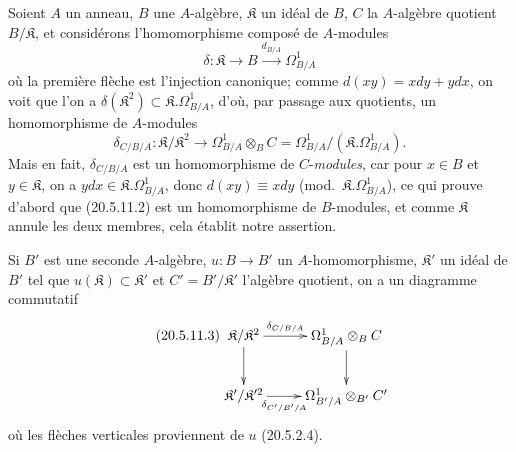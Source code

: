 \begin{env}[20.5.11]
\label{0.20.5.11-fr}
Soient $A$ un anneau, $B$ une $A$-algèbre, $\mathfrak{K}$ un idéal de $B$,
$C$ la $A$-algèbre quotient $B/\mathfrak{K}$, et considérons
l'homomorphisme composé de $A$-modules
\begin{equation}
\tag{20.5.11.1}
\label{0.20.5.11.1-fr}
  \delta:\mathfrak{K}\longrightarrow B\xrightarrow{d_{B/A}}\Omega^1_{B/A}
\end{equation}
où la première flèche est l'injection canonique; comme
$d(xy)=xdy+ydx$, on voit que l'on a
$\delta(\mathfrak{K}^2)\subset\mathfrak{K}.\Omega^1_{B/A}$, d'où, par
passage aux quotients, un homomorphisme de $A$-modules
\begin{equation}
\tag{20.5.11.2}
\label{0.20.5.11.2-fr}
  \delta_{C/B/A}:\mathfrak{K}/\mathfrak{K}^2\longrightarrow
  \Omega^1_{B/A}\otimes_B C=
  \Omega^1_{B/A}/(\mathfrak{K}.\Omega^1_{B/A}).
\end{equation}
Mais en fait, $\delta_{C/B/A}$ est un homomorphisme de $C$-\emph{modules}, car
pour $x\in B$ et $y\in\mathfrak{K}$, on a
$ydx\in\mathfrak{K}.\Omega^1_{B/A}$, donc
$d(xy)\equiv xdy$ (mod.~$\mathfrak{K}.\Omega^1_{B/A}$), ce qui prouve
d'abord que (20.5.11.2) est un homomorphisme de $B$-modules, et comme
$\mathfrak{K}$ annule les deux membres, cela établit notre assertion.

Si $B'$ est une seconde $A$-algèbre, $u:B\to B'$ un $A$-homomorphisme,
$\mathfrak{K}'$ un idéal de $B'$ tel que
$u(\mathfrak{K})\subset\mathfrak{K}'$ et $C'=B'/\mathfrak{K}'$ l'algèbre
quotient, on a un diagramme commutatif
\begin{equation}
\tag{20.5.11.3}
\label{0.20.5.11.3-fr}
\xymatrix{
  \mathfrak{K}/\mathfrak{K}^2 \ar[r]^-{\delta_{C/B/A}} \ar[d] &
  \Omega^1_{B/A}\otimes_B C \ar[d] \\
  \mathfrak{K}'/\mathfrak{K}'^2 \ar[r]_-{\delta_{C'/B'/A}} &
  \Omega^1_{B'/A}\otimes_{B'} C'
}
\end{equation}
où les flèches verticales proviennent de $u$ (20.5.2.4).
\end{env}

